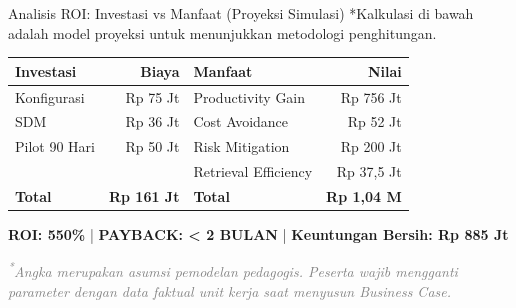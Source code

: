 \documentclass[aspectratio=169,11pt]{beamer}
\begin{document}
\begin{frame}{Analisis ROI: Investasi vs Manfaat (Proyeksi Simulasi)}
    \centering
    \fontsize{5}{6}\selectfont \color{gray} *Kalkulasi di bawah adalah model proyeksi untuk menunjukkan metodologi penghitungan.
    \begin{table}
        \centering
        \scriptsize
        \begin{tabularx}{\textwidth}{@{} X r X r @{}}
            \toprule
            \textbf{Investasi} & \textbf{Biaya} & \textbf{Manfaat} & \textbf{Nilai} \\
            \midrule
            Konfigurasi & Rp 75 Jt & Productivity Gain & Rp 756 Jt \\
            SDM & Rp 36 Jt & Cost Avoidance & Rp 52 Jt \\
            Pilot 90 Hari & Rp 50 Jt & Risk Mitigation & Rp 200 Jt \\
             & & Retrieval Efficiency & Rp 37,5 Jt \\
            \midrule
            \textbf{Total} & \textbf{Rp 161 Jt} & \textbf{Total} & \textbf{Rp 1,04 M} \\
            \bottomrule
        \end{tabularx}
    \end{table}
    \centering
    \begin{premiumbox}
        \centering
        \small \textbf{ROI: 550\%} \quad | \quad \textbf{PAYBACK: < 2 BULAN} \quad | \quad \textbf{Keuntungan Bersih: Rp 885 Jt}
    \end{premiumbox}
    \vspace{0.1cm}
    {\tiny\itshape\textcolor{gray}{\textsuperscript{*}Angka merupakan asumsi pemodelan pedagogis. Peserta wajib mengganti parameter dengan data faktual unit kerja saat menyusun Business Case.}}
\end{frame}
\end{document}
